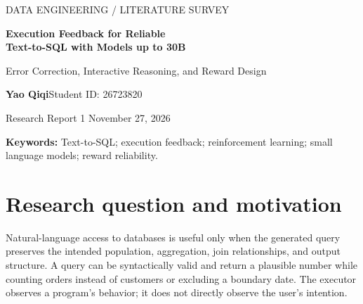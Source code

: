 \documentclass[11pt,a4paper]{article}
\begin{document}
\begin{center}
{\small DATA ENGINEERING / LITERATURE SURVEY}\par\vspace{8pt}
{\LARGE\bfseries\color{navy} Execution Feedback for Reliable\\[4pt] Text-to-SQL with Models up to 30B}\par\vspace{7pt}
{\large Error Correction, Interactive Reasoning, and Reward Design}\par\vspace{12pt}
\textbf{Yao Qiqi}\quad Student ID: 26723820\par
Research Report 1 \quad November 27, 2026
\end{center}
\vspace{5pt}
\begin{abstract}
Executing a generated SQL query provides useful feedback, but successful execution does not establish that the query answers the user's question. This survey examines ten 2026 publications on execution-feedback correction and learning for Text-to-SQL, emphasizing policy models with at most 30 billion parameters. It organizes the evidence around interaction, credit assignment, and verification rather than a single accuracy ranking. Multi-turn reasoning can recover errors, while clause-, step-, and token-level rewards can make training signals more specific. However, their benefits depend on candidate budgets, access to reference answers, and the reliability of execution-based rewards. The strongest deployment claim requires a feedback signal available without a gold query and an evaluation that exposes semantically wrong yet executable SQL. The report compares matched ablations, identifies limitations of headline results, supplies a small executable counterexample, and proposes a budget-controlled evaluation protocol. It is a critical literature survey, not a reproduction of the ten model-training experiments.
\end{abstract}
\textbf{Keywords:} Text-to-SQL; execution feedback; reinforcement learning; small language models; reward reliability.

\section{Research question and motivation}
Natural-language access to databases is useful only when the generated query preserves the intended population, aggregation, join relationships, and output structure. A query can be syntactically valid and return a plausible number while counting orders instead of customers or excluding a boundary date. The executor observes a program's behavior; it does not directly observe the user's intention.
\end{document}
